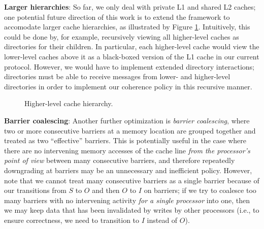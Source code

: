 \documentclass{article}
\begin{document}
\textbf{Larger hierarchies}: So far, we only deal with private L1 and shared L2 caches; one potential future direction of this work is to extend the framework to accomodate larger cache hierarchies, as illustrated by Figure \ref{multi-hierarchy}. Intuitively, this could be done by, for example, recursively viewing all higher-level caches as directories for their children. In particular, each higher-level cache would view the lower-level caches above it as a black-boxed version of the L1 cache in our current protocol. However, we would have to implement extended directory interactions; directories must be able to receive messages from lower- and higher-level directories in order to implement our coherence policy in this recursive manner.

\begin{figure}[H]
\begin{center}
\end{center}
\caption{Higher-level cache hierarchy.}
\label{multi-hierarchy}
\end{figure}

\textbf{Barrier coalescing}: Another further optimization is \textit{barrier coalescing}, where two or more consecutive barriers at a memory location are grouped together and treated as two ``effective'' barriers. This is potentially useful in the case where there are no intervening memory accesses of the cache line \textit{from the processor's point of view} between many consecutive barriers, and therefore repeatedly downgrading at barriers may be an unnecessary and inefficient policy. However, note that we cannot treat many consecutive barriers as a single barrier because of our transitions from $S$ to $O$ and then $O$ to $I$ on barriers; if we try to coalesce too many barriers with no intervening activity \textit{for a single processor} into one, then we may keep data that has been invalidated by writes by other processors (i.e., to ensure correctness, we need to transition to $I$ instead of $O$).

\printbibliography
\end{document}

